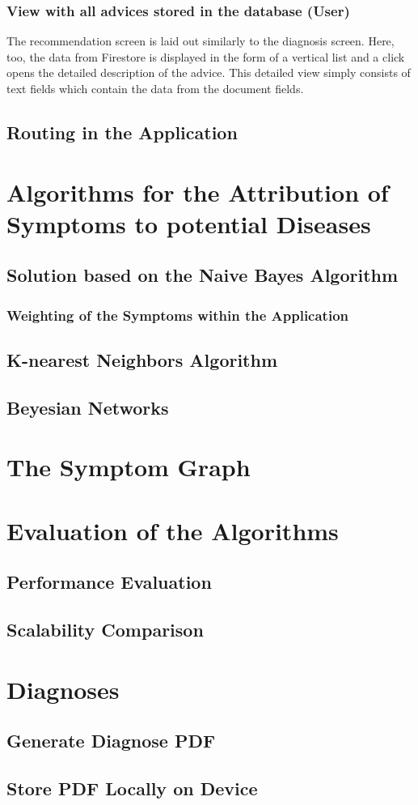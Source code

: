 \subsubsection{\textbf{View with all advices stored in the database (User) }}
The recommendation screen is laid out similarly to the diagnosis screen. Here, too, the data from Firestore is displayed in the form of a vertical list and a click opens the detailed description of the advice. This detailed view simply consists of text fields which contain the data from the document fields.

\subsection{Routing in the Application}
\section{Algorithms for the Attribution of Symptoms to potential Diseases}
\subsection{Solution based on the Naive Bayes Algorithm}
\subsubsection{Weighting of the Symptoms within the Application}
\subsection{K-nearest Neighbors Algorithm}
\subsection{Beyesian Networks}
\section{The Symptom Graph}
\section{Evaluation of the Algorithms}
\subsection{Performance Evaluation}
\subsection{Scalability Comparison}
\section{Diagnoses}
\subsection{Generate Diagnose PDF}
\subsection{Store PDF Locally on Device}


